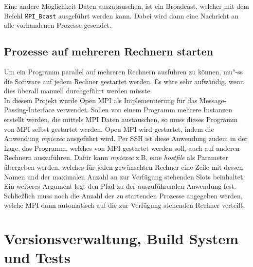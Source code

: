 \documentclass[12pt,a4paper]{scrreprt}
\newcommand{\includecode}[3]{}
\begin{document}
\includecode{lst:mpi_send_recv}{Daten mit MPI senden und empfangen}{code/mpi_send_recv.cpp}

Eine andere Möglichkeit Daten auszutauschen, ist ein Broadcast, welcher mit dem Befehl \lstinline$MPI_Bcast$ ausgeführt werden kann. Dabei wird dann eine Nachricht an alle vorhandenen Prozesse gesendet.

\subsection{Prozesse auf mehreren Rechnern starten}
\label{subsec:prozessstart}

Um ein Programm parallel auf mehreren Rechnern ausführen zu können, mu"-ss die Software auf jedem Rechner gestartet werden. Es wäre sehr aufwändig, wenn dies überall manuell durchgeführt werden müsste.\\
In diesem Projekt wurde Open MPI als Implementierung für das Message-Passing-Interface verwendet. Sollen von einem Programm mehrere Instanzen erstellt werden, die mittels MPI Daten austauschen, so muss dieses Programm von MPI selbst gestartet werden. Open MPI wird gestartet, indem die Anwendung \textit{mpiexec} ausgeführt wird. Per SSH ist diese Anwendung zudem in der Lage, das Programm, welches von MPI gestartet werden soll, auch auf anderen Rechnern auszuführen. Dafür kann \textit{mpiexec} z.B. eine \textit{hostfile} als Parameter übergeben werden, welches für jeden gewünschten Rechner eine Zeile mit dessen Namen und der maximalen Anzahl an zur Verfügung stehenden Slots beinhaltet. Ein weiteres Argument legt den Pfad zu der auszuführenden Anwendung fest. Schließlich muss noch die Anzahl der zu startenden Prozesse angegeben werden, welche MPI dann automatisch auf die zur Verfügung stehenden Rechner verteilt.

\section{Versionsverwaltung, Build System und Tests}
\label{sec:versionsverwaltung}
\end{document}
